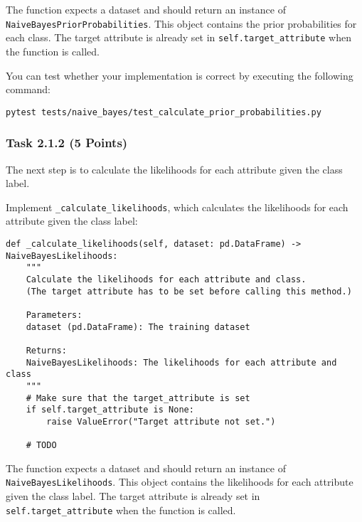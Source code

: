 \documentclass[
english,
smallborders
]{i6prcsht}
\newcommand{\points}[1]{\hfill \color{red}(#1 Points)\color{black}}
\begin{document}
\vspace*{0.1cm}

The function expects a dataset and should return an instance of \texttt{NaiveBayesPriorProbabilities}. This object contains the prior probabilities for each class. The target attribute is already set in \texttt{self.target\_attribute} when the function is called.

You can test whether your implementation is correct by executing the following command:

\vspace*{0.3cm}

\begin{lstlisting}
pytest tests/naive_bayes/test_calculate_prior_probabilities.py
\end{lstlisting}

\vspace*{0.1cm}

\subsubsection*{Task 2.1.2 \points{5}}

The next step is to calculate the likelihoods for each attribute given the class label.

Implement \texttt{\_calculate\_likelihoods}, which calculates the likelihoods for each attribute given the class label:

\vspace*{0.3cm}

\begin{lstlisting}
def _calculate_likelihoods(self, dataset: pd.DataFrame) -> NaiveBayesLikelihoods:
	"""
	Calculate the likelihoods for each attribute and class.
	(The target attribute has to be set before calling this method.)

	Parameters:
	dataset (pd.DataFrame): The training dataset

	Returns:
	NaiveBayesLikelihoods: The likelihoods for each attribute and class
	"""
	# Make sure that the target_attribute is set
	if self.target_attribute is None:
		raise ValueError("Target attribute not set.")

	# TODO
\end{lstlisting}

\vspace*{0.1cm}

The function expects a dataset and should return an instance of \texttt{NaiveBayesLikelihoods}. This object contains the likelihoods for each attribute given the class label. The target attribute is already set in \texttt{self.target\_attribute} when the function is called.
\end{document}
